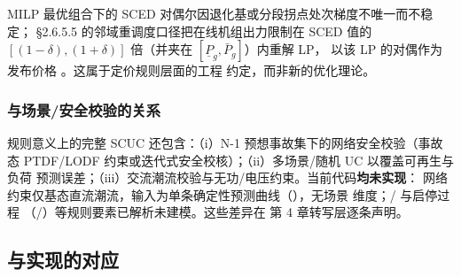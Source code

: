 \begin{remark}
MILP 最优组合下的 SCED 对偶尔因退化基或分段拐点处次梯度不唯一而不稳定；
§2.6.5.5 的邻域重调度口径把在线机组出力限制在 SCED 值的
$[(1-\delta),(1+\delta)]$ 倍（并夹在 $[\underline P_g,\bar P_g]$）内重解 LP，
以该 LP 的对偶作为发布价格 \cite{southern2025}。这属于定价规则层面的工程
约定，而非新的优化理论。
\end{remark}

\subsubsection{与场景/安全校验的关系}

\begin{gapnote}
规则意义上的完整 SCUC 还包含：（i）N-1 预想事故集下的网络安全校验（事故态
PTDF/LODF 约束或迭代式安全校核）；（ii）多场景/随机 UC 以覆盖可再生与负荷
预测误差；（iii）交流潮流校验与无功/电压约束。当前代码\textbf{均未实现}：
网络约束仅基态直流潮流，输入为单条确定性预测曲线（），无场景
维度；/ 与启停过程
（/）等规则要素已解析未建模。这些差异在
第 4 章转写层逐条声明。
\end{gapnote}

\subsection{与实现的对应}

